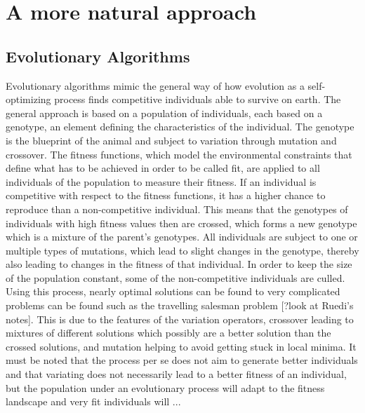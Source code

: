 \documentclass[main]{subfiles}
\begin{document}
\lipsum[1]


\section{A more natural approach}

\lipsum[1]


\subsection{Evolutionary Algorithms}

Evolutionary algorithms mimic the general way of how evolution as a self-optimizing process finds competitive individuals able to survive on earth. The general approach is based on a population of individuals, each based on a genotype, an element defining the characteristics of the individual. The genotype is the blueprint of the animal and subject to variation through mutation and crossover. The fitness functions, which model the environmental constraints that define what has to be achieved in order to be called fit, are applied to all individuals of the population to measure their fitness. If an individual is competitive with respect to the fitness functions, it has a higher chance to reproduce than a non-competitive individual. This means that the genotypes of individuals with high fitness values then are crossed, which forms a new genotype which is a mixture of the parent's genotypes. All individuals are subject to one or multiple types of mutations, which lead to slight changes in the genotype, thereby also leading to changes in the fitness of that individual. In order to keep the size of the population constant, some of the non-competitive individuals are culled. Using this process, nearly optimal solutions can be found to very complicated problems can be found such as the travelling salesman problem [?look at Ruedi's notes]. This is due to the features of the variation operators, crossover leading to mixtures of different solutions which possibly are a better solution than the crossed solutions, and mutation helping to avoid getting stuck in local minima. It must be noted that the process per se does not aim to generate better individuals and that variating does not necessarily lead to a better fitness of an individual, but the population under an evolutionary process will adapt to the fitness landscape and very fit individuals will ...
\end{document}
